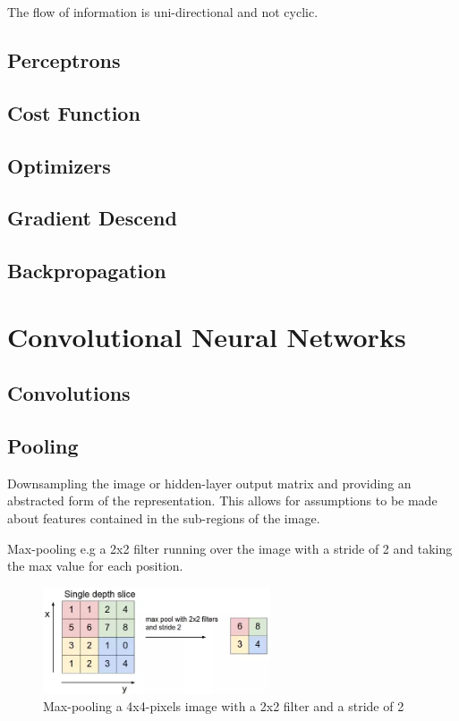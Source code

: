 \documentclass[a4paper,english]{report}
\begin{document}
        The flow of information is uni-directional and not cyclic.

        \section{Perceptrons}

        \section{Cost Function}

        \section{Optimizers}
        \section{Gradient Descend}
        \section{Backpropagation}        
        \chapter{Convolutional Neural Networks}
        \section{Convolutions}
    	\section{Pooling}
    	Downsampling the image or hidden-layer output matrix and providing an abstracted form of the representation. This allows for assumptions to be made about features contained in the sub-regions of the image.
    	
    	Max-pooling e.g a 2x2 filter running over the image with a stride of 2 and taking the max value for each position.
    	
   		\begin{figure}[h]
    		\centering
    		\includegraphics[width=0.6\textwidth]{figures/max_pooling.png}
    		\caption{Max-pooling a 4x4-pixels image with a 2x2 filter and a stride of 2}
    		\label{fig:maxpooling}
    	\end{figure}
    	
\end{document}
